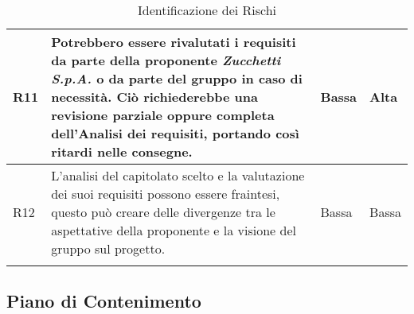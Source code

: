 \begin{longtable}{|C{.11\textwidth}|C{.47\textwidth}|C{.15\textwidth}|C{.15\textwidth}|}
\hline
R11 & Potrebbero essere rivalutati i requisiti da parte della proponente \textit{Zucchetti S.p.A.} o da parte del gruppo in caso di necessità. Ciò richiederebbe una revisione parziale oppure completa dell'Analisi dei requisiti, portando così ritardi nelle consegne. & Bassa & Alta \\
\hline
{}R12 & L'analisi del capitolato scelto e la valutazione dei suoi requisiti possono essere fraintesi, questo può creare delle divergenze tra le aspettative della proponente e la visione del gruppo sul progetto. & Bassa & Bassa\\
\hline
\caption{Identificazione dei Rischi
\label{Tabella Identificazione dei Rischi}}
\end{longtable}

\subsection{Piano di Contenimento}
\label{RischiContenimento}

